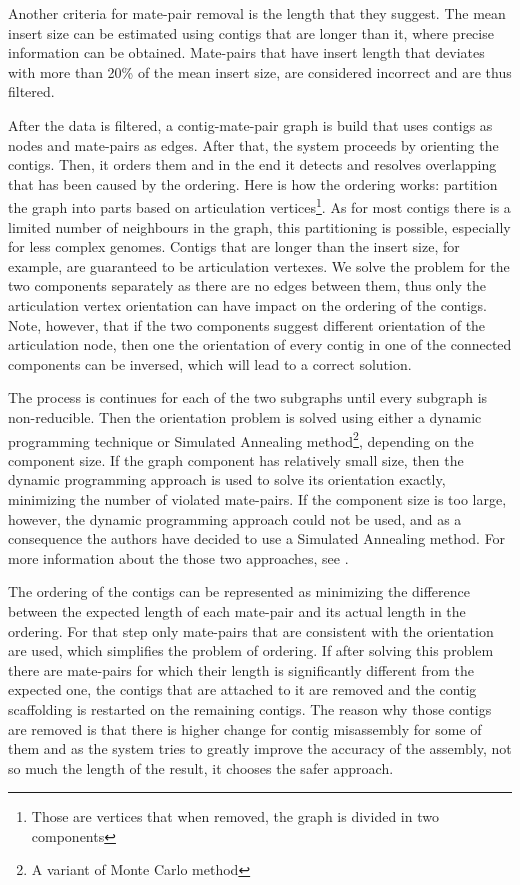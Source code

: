 \documentclass[11pt]{article}
\begin{document}
Another criteria for mate-pair removal is the length that they suggest. The
mean insert size can be estimated using contigs that are longer than it, where
precise information can be obtained. Mate-pairs that have insert length that
deviates with more than 20\% of the mean insert size, are considered incorrect
and are thus filtered.

After the data is filtered, a contig-mate-pair graph is build that uses contigs
as nodes and mate-pairs as edges. After that, the system proceeds by orienting
the contigs. Then, it orders them and in the end it detects and resolves
overlapping that has been caused by the ordering. Here is how the ordering
works: partition the graph into parts based on articulation
vertices\footnote{Those are vertices that when removed, the graph is divided in
two components}. As for most contigs there is a limited number of neighbours in
the graph, this partitioning is possible, especially for less complex genomes.
Contigs that are longer than the insert size, for example, are guaranteed to be
articulation vertexes. We solve the problem for the two components separately as
there are no edges between them, thus only the articulation vertex orientation
can have impact on the ordering of the contigs. Note, however, that if the two
components suggest different orientation of the articulation node, then one the
orientation of every contig in one of the connected components can be inversed,
which will lead to a correct solution.

The process is continues for each of the two subgraphs until every subgraph is
non-reducible. Then the orientation problem is solved using either a dynamic
programming technique or Simulated Annealing method\footnote{A variant of Monte
Carlo method}, depending on the component size. If the graph component has
relatively small size, then the dynamic programming approach is used to solve
its orientation exactly, minimizing the number of violated mate-pairs. If the
component size is too large, however, the dynamic programming approach could not
be used, and as a consequence the authors have decided to use a Simulated
Annealing method. For more information about the those two approaches, see
\cite{SOPRA}.

The ordering of the contigs can be represented as minimizing the difference
between the expected length of each mate-pair and its actual length in the
ordering. For that step only mate-pairs that are consistent with the orientation
are used, which simplifies the problem of ordering. If after solving this
problem there are mate-pairs for which their length is significantly different
from the expected one, the contigs that are attached to it are removed and the
contig scaffolding is restarted on the remaining contigs. The reason why those
contigs are removed is that there is higher change for contig misassembly for
some of them and as the system tries to greatly improve the accuracy of the
assembly, not so much the length of the result, it chooses the safer approach.
\end{document}
